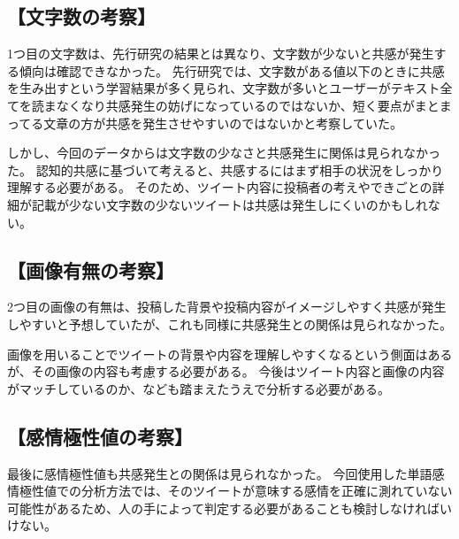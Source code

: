 \documentclass[dvipdfmx]{issj}
\begin{document}
\subsection{【文字数の考察】}  %
1つ目の文字数は、先行研究の結果とは異なり、文字数が少ないと共感が発生する傾向は確認できなかった。
先行研究では、文字数がある値以下のときに共感を生み出すという学習結果が多く見られ、文字数が多いとユーザーがテキスト全てを読まなくなり共感発生の妨げになっているのではないか、短く要点がまとまってる文章の方が共感を発生させやすいのではないかと考察していた。

しかし、今回のデータからは文字数の少なさと共感発生に関係は見られなかった。
認知的共感に基づいて考えると、共感するにはまず相手の状況をしっかり理解する必要がある。
そのため、ツイート内容に投稿者の考えやできごとの詳細が記載が少ない文字数の少ないツイートは共感は発生しにくいのかもしれない。

\subsection{【画像有無の考察】}  %
2つ目の画像の有無は、投稿した背景や投稿内容がイメージしやすく共感が発生しやすいと予想していたが、これも同様に共感発生との関係は見られなかった。

画像を用いることでツイートの背景や内容を理解しやすくなるという側面はあるが、その画像の内容も考慮する必要がある。
今後はツイート内容と画像の内容がマッチしているのか、なども踏まえたうえで分析する必要がある。

\subsection{【感情極性値の考察】}  %
最後に感情極性値も共感発生との関係は見られなかった。
今回使用した単語感情極性値での分析方法では、そのツイートが意味する感情を正確に測れていない可能性があるため、人の手によって判定する必要があることも検討しなければいけない。

\end{document}
